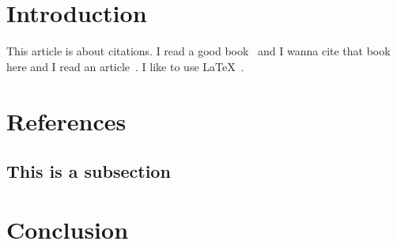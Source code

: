 \documentclass{article}
\title{}
\author{Aakash Pahuja}
\date{} %
\begin{document}
\maketitle

\section{Introduction}

This article is about citations. I read a good book~\cite{Aakash2018} and I wanna cite that book here and I read an article~\cite{Pahuja2018}. I like to use \LaTeX~\cite{latex}.

\section{References}





\subsection{This is a subsection}

\section{Conclusion}
\end{document}
